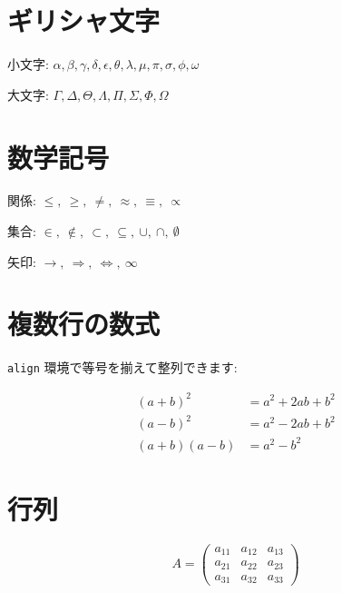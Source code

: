 \documentclass[lualatex,ja=standard]{bxjsarticle}
\begin{document}
\section{ギリシャ文字}

小文字: $\alpha, \beta, \gamma, \delta, \epsilon, \theta, \lambda, \mu, \pi, \sigma, \phi, \omega$

大文字: $\Gamma, \Delta, \Theta, \Lambda, \Pi, \Sigma, \Phi, \Omega$

\section{数学記号}

関係: $\leq,\ \geq,\ \neq,\ \approx,\ \equiv,\ \propto$

集合: $\in,\ \notin,\ \subset,\ \subseteq,\ \cup,\ \cap,\ \emptyset$

矢印: $\to,\ \Rightarrow,\ \Leftrightarrow,\ \infty$

\section{複数行の数式}

\texttt{align} 環境で等号を揃えて整列できます:

\begin{align}
  (a + b)^2 &= a^2 + 2ab + b^2 \\
  (a - b)^2 &= a^2 - 2ab + b^2 \\
  (a + b)(a - b) &= a^2 - b^2
\end{align}

\section{行列}

\[
  A = \begin{pmatrix}
    a_{11} & a_{12} & a_{13} \\
    a_{21} & a_{22} & a_{23} \\
    a_{31} & a_{32} & a_{33}
  \end{pmatrix}
\]
\end{document}
